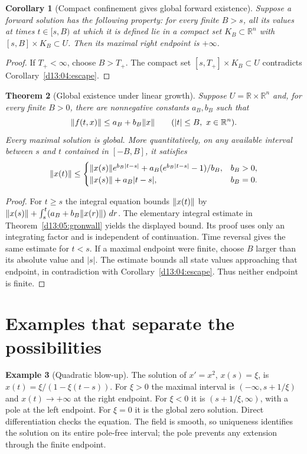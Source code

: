 \documentclass[11pt,oneside]{book}
\newtheorem{theorem}{Theorem}[chapter]
\newtheorem{corollary}[theorem]{Corollary}
\theoremstyle{definition}
\newtheorem{example}[theorem]{Example}
\theoremstyle{remark}\newtheorem{remark}[theorem]{Remark}
\newcommand{\R}{\mathbb R}\newcommand{\C}{\mathbb C}
\newcommand{\dd}{\,d}\newcommand{\id}{\operatorname{id}}
\begin{document}
\begin{corollary}[Compact confinement gives global forward existence]\label{d13:04:confinement}
Suppose a forward solution has the following property: for every finite
$B>s$, all its values at times $t\in[s,B)$ at which it is defined lie
in a compact set $K_B\subset\R^n$ with $[s,B]\times K_B\subset U$.
Then its maximal right endpoint is $+\infty$.
\end{corollary}
\begin{proof}
If $T_+<\infty$, choose $B>T_+$. The compact set
$[s,T_+]\times K_B\subset U$ contradicts
Corollary~\ref{d13:04:escape}.
\end{proof}

\begin{theorem}[Global existence under linear growth]\label{d13:04:linear-growth}
Suppose $U=\R\times\R^n$ and, for every finite $B>0$, there are
nonnegative constants $a_B,b_B$ such that
\[
 \norm{f(t,x)}\leq a_B+b_B\norm{x}
 \qquad(|t|\leq B,\ x\in\R^n).
\]
Every maximal solution is global. More quantitatively, on any available
interval between $s$ and $t$ contained in $[-B,B]$, it satisfies
\[
 \lVert x(t)\rVert\leq
 \begin{cases}
 \lVert x(s)\rVert e^{b_B|t-s|}
       +a_B(e^{b_B|t-s|}-1)/b_B,&b_B>0,\\
 \lVert x(s)\rVert+a_B|t-s|,&b_B=0.
 \end{cases}
\]
\end{theorem}
\begin{proof}
For $t\geq s$ the integral equation bounds $\lVert x(t)\rVert$ by
$\norm{x(s)}+\int_s^t(a_B+b_B\norm{x(r)})\,\dd r$.
The elementary integral estimate in
Theorem~\ref{d13:05:gronwall} yields the displayed bound. Its proof
uses only an integrating factor and is independent of continuation.
Time reversal gives the same estimate for $t<s$. If a maximal endpoint
were finite, choose $B$ larger than its absolute value and $|s|$. The
estimate bounds all state values approaching that endpoint, in
contradiction with Corollary~\ref{d13:04:escape}. Thus neither endpoint
is finite.
\end{proof}

\section{Examples that separate the possibilities}
\begin{example}[Quadratic blow-up]\label{d13:04:quadratic-blowup}
The solution of $x'=x^2$, $x(s)=\xi$, is
$x(t)=\xi/(1-\xi(t-s))$. For $\xi>0$ the maximal interval is
$(-\infty,s+1/\xi)$ and $x(t)\to+\infty$ at the right endpoint.
For $\xi<0$ it is $(s+1/\xi,\infty)$, with a pole at the left
endpoint. For $\xi=0$ it is the global zero solution. Direct
differentiation checks the equation. The field is smooth, so uniqueness
identifies the solution on its entire pole-free interval; the pole
prevents any extension through the finite endpoint.
\end{example}
\end{document}
